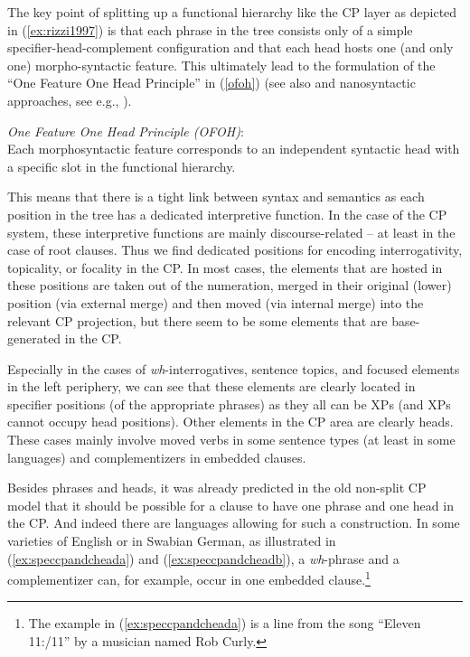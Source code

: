 \noindent The key point of splitting up a functional hierarchy like the CP layer as depicted in (\ref{ex:rizzi1997}) is that each phrase in the tree consists only of a simple specifier-head-complement configuration and that each head hosts one (and only one) morpho-syntactic feature. This ultimately lead to the formulation of the ``One Feature One Head Principle'' \citep[45]{cinque2008cartography} in (\ref{ofoh}) (see also \citealt{kayne2005some} and nanosyntactic approaches, see e.g., \citealt{starke2009nanosyntax}).

\begin{exe}
\ex \textit{One Feature One Head Principle (OFOH)}:  \\
Each morphosyntactic feature corresponds to an independent syntactic head with a specific slot in the functional hierarchy.\label{ofoh}
\end{exe}

\noindent This means that there is a tight link between syntax and semantics as each position in the tree has a dedicated interpretive function. In the case of the CP system, these interpretive functions are mainly discourse-related -- at least in the case of root clauses. Thus we find dedicated positions for encoding interrogativity, topicality, or focality in the CP. In most cases, the elements that are hosted in these positions are taken out of the numeration, merged in their original (lower) position (via external merge) and then moved (via internal merge) into the relevant CP projection, but there seem to be some elements that are base-generated in the CP. 

Especially in the cases of \textit{wh}-interrogatives, sentence topics, and focused elements in the left periphery, we can see that these elements are clearly located in specifier positions (of the appropriate phrases) as they all can be XPs (and XPs cannot occupy head positions). Other elements in the CP area are clearly heads. These cases mainly involve moved verbs in some sentence types (at least in some languages) and complementizers in embedded clauses.

Besides phrases and heads, it was already predicted in the old non-split CP model that it should be possible for a clause to have one phrase and one head in the CP. And indeed there are languages allowing for such a construction. In some varieties of English or in Swabian German, as illustrated in (\ref{ex:speccpandcheada}) and (\ref{ex:speccpandcheadb}), a \textit{wh}-phrase and a complementizer can, for example, occur in one embedded clause.\footnote{The example in (\ref{ex:speccpandcheada}) is a line from the song ``Eleven 11:/11'' by a musician named Rob Curly.}

